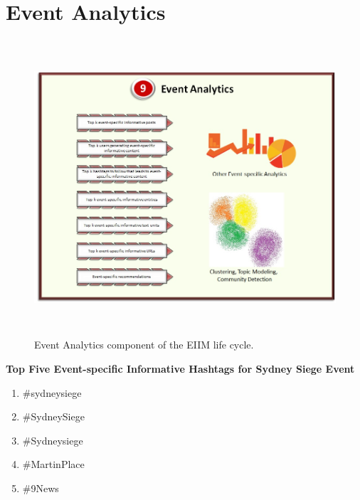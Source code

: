 \section{Event Analytics}
\begin{figure}[htbp]
  \caption{Event Analytics component of the EIIM life cycle.}
  \centering
    \includegraphics[width=14cm,height=11cm]{Figures/EIIMComponents/EventAnalytics.jpg}
\end{figure}

\textbf{Top Five Event-specific Informative Hashtags for Sydney Siege Event}
\begin{enumerate}
\item \#sydneysiege 
\item \#SydneySiege
\item \#Sydneysiege
\item \#MartinPlace
\item \#9News                                                                                                                                                                                                                                                                                                                                                                                                                                                                                                                 
\end{enumerate}


